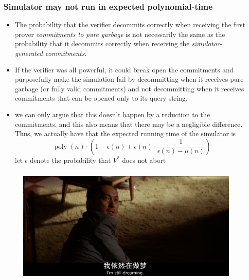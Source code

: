 \documentclass{beamer}
\begin{document}
    \begin{frame}
        \frametitle{Simulator may not run in expected polynomial-time}
        \begin{itemize}
            \item The probability that the verifier decommits correctly when receiving the first prover \emph{commitments to pure garbage} is not necessarily the same as the probability that it decommits correctly when receiving the \emph{simulator-generated commitments}. 
            \item If the verifier was all powerful, it could break open the commitments and purposefully make the simulation fail by decommitting when it receives pure garbage (or fully valid commitments) and not decommitting when it receives commitments that can be opened only to its query string. 
            \item we can only argue that this doesn't happen by a reduction to the commitments, and this also means that there may be a negligible difference. Thus, we actually have that the expected running time of the simulator is
            $$
            \operatorname{poly}(n) \cdot\left(1-\epsilon(n)+\epsilon(n) \cdot \frac{1}{\epsilon(n)-\mu(n)}\right)
            $$
            let $\epsilon$ denote the probability that $V^{*}$ does not abort  
        \end{itemize}
    
        
    
    \end{frame}

    \begin{frame}
        \frametitle{}
    
        \begin{figure}
            \includegraphics[scale=0.2]{inception.png}
        \end{figure}
    
    \end{frame}
\end{document}
